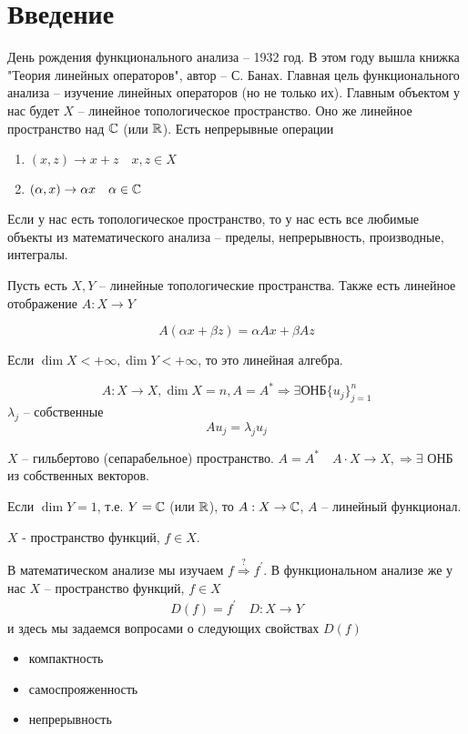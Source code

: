 \documentclass[document]{subfiles}
\begin{document}
\chapter{Введение}
День рождения функционального анализа -- 1932 год. В этом году вышла книжка "Теория линейных операторов", автор -- С. Банах. Главная цель функционального анализа --
 изучение линейных операторов (но не только их).
Главным объектом у нас будет $X$ -- линейное топологическое пространство. Оно же линейное пространство над $\mathbb{C}$ (или $\mathbb{R}$).
Есть непрерывные операции
\begin{enumerate}
    \item $(x,z) \rightarrow x + z \quad x,z \in X$
    \item $(\alpha,x) \rightarrow \alpha x \quad \alpha \in \mathbb{C}$
\end{enumerate}
Если у нас есть топологическое пространство, то у нас есть все любимые объекты из математического анализа -- пределы, непрерывность, производные, интегралы.

Пусть есть $X,Y$ -- линейные топологические пространства. Также есть линейное отображение $A: X \rightarrow Y$
\begin{definition}
    \[ A(\alpha x + \beta z) = \alpha A x + \beta A z \]
\end{definition}

Если $\dim X < + \infty, \dim Y < + \infty$, то это линейная алгебра.

\[A: X \rightarrow X, \dim X = n, A = A^* \Rightarrow \exists \text {ОНБ} \{u_j\}_{j=1}^n \]
$\lambda_j$ -- собственные 
\[ A u_j = \lambda_j u_j \]
\begin{theorem}[Гильберт]
    $X$ -- гильбертово (сепарабельное) пространство.
    $A = A^* \quad A \cdot X \rightarrow X, \Rightarrow \exists$ ОНБ из собственных векторов.
\end{theorem}

Если $\dim Y = 1$, т.е. $Y = \mathbb{C}$ (или $\mathbb{R}$), то $A: X \rightarrow \mathbb{C}$, $A$ -- линейный функционал.

$X$ - пространство функций, $f \in X$.

В математическом анализе мы изучаем $f \stackrel{?}{\Rightarrow} f^\prime$.
В функциональном анализе же у нас $X$ -- пространство функций, $f \in X$
\begin{gather}
    D(f) =  f^\prime \quad D: X \rightarrow Y
\end{gather}
и здесь мы задаемся вопросами о следующих свойствах $D(f)$
\begin{itemize}
    \item компактность
    \item самоспрояженность
    \item непрерывность
\end{itemize}
\end{document}

